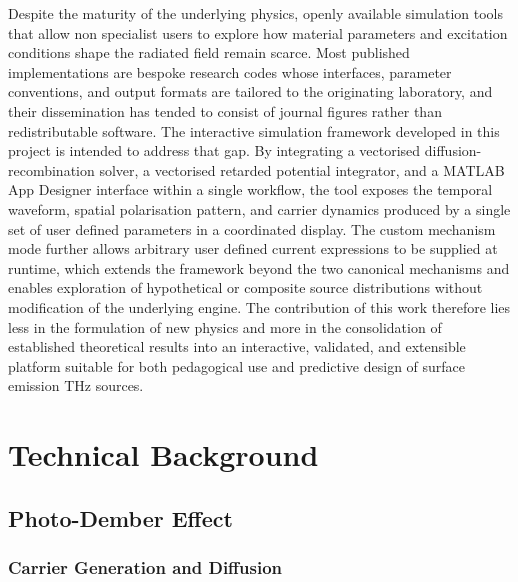 \documentclass[12pt]{final_project_report}
\begin{document}
Despite the maturity of the underlying physics, openly available simulation tools that allow non specialist users to explore how material parameters and excitation conditions shape the radiated field remain scarce. Most published implementations are bespoke research codes whose interfaces, parameter conventions, and output formats are tailored to the originating laboratory, and their dissemination has tended to consist of journal figures rather than redistributable software. The interactive simulation framework developed in this project is intended to address that gap. By integrating a vectorised diffusion-recombination solver, a vectorised retarded potential integrator, and a MATLAB App Designer interface within a single workflow, the tool exposes the temporal waveform, spatial polarisation pattern, and carrier dynamics produced by a single set of user defined parameters in a coordinated display. The custom mechanism mode further allows arbitrary user defined current expressions to be supplied at runtime, which extends the framework beyond the two canonical mechanisms and enables exploration of hypothetical or composite source distributions without modification of the underlying engine. The contribution of this work therefore lies less in the formulation of new physics and more in the consolidation of established theoretical results into an interactive, validated, and extensible platform suitable for both pedagogical use and predictive design of surface emission THz sources.

\section{Technical Background}
\subsection{Photo-Dember Effect}
\subsubsection{Carrier Generation and Diffusion}
\end{document}
